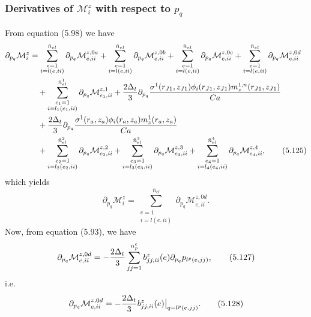 \documentclass{article}
\begin{document}
\subsubsection{Derivatives of $\mathcal{M}_i^z$ with respect to $p_q$} %
From equation (5.98) we have
\begin{align}
\partial_{p_q}\mathcal{M}_i^z &= \sum_{\substack{e=1\\ i=l(e,ii)}}^{\bar{n}_{el}} \partial_{p_q} \mathcal{M}_{e,ii}^{z,0a} + \sum_{\substack{e=1\\ i=l(e,ii)}}^{\bar{n}_{el}} \partial_{p_q} \mathcal{M}_{e,ii}^{z,0b} + \sum_{\substack{e=1\\ i=l(e,ii)}}^{\bar{n}_{el}} \partial_{p_q} \mathcal{M}_{e,ii}^{z,0c} + \sum_{\substack{e=1\\ i=l(e,ii)}}^{\bar{n}_{el}} \partial_{p_q} \mathcal{M}_{e,ii}^{z,0d} \nonumber\\
&\quad + \sum_{\substack{e_1=1\\ i=l_1(e_1,ii)}}^{\bar{n}_{el}^1} \partial_{p_q} \mathcal{M}_{e_1,ii}^{z,1} + \frac{2\Delta_t}{3} \partial_{p_q} \frac{\sigma^1(r_{J1},z_{J1}) \phi_i(r_{J1},z_{J1}) m_z^{1,n}(r_{J1},z_{J1})}{Ca} \nonumber\\
&\quad + \frac{2\Delta_t}{3} \partial_{p_q} \frac{\sigma^1(r_a,z_a) \phi_i(r_a,z_a) m_z^{1}(r_a,z_a)}{Ca} \nonumber\\
&\quad + \sum_{\substack{e_2=1\\ i=l_2(e_2,ii)}}^{\bar{n}_{el}^2} \partial_{p_q} \mathcal{M}_{e_2,ii}^{z,2} + \sum_{\substack{e_3=1\\ i=l_3(e_3,ii)}}^{\bar{n}_{el}^3} \partial_{p_q} \mathcal{M}_{e_3,ii}^{z,3} + \sum_{\substack{e_4=1\\ i=l_4(e_4,ii)}}^{\bar{n}_{el}^4} \partial_{p_q} \mathcal{M}_{e_4,ii}^{z,4}, \tag{5.125}
\end{align}
which yields
\begin{equation}
\partial_{p_q}\mathcal{M}_i^z = \sum_{\substack{e=1\\ i=l(e,ii)}}^{\bar{n}_{el}} \partial_{p_q} \mathcal{M}_{e,ii}^{z,0d}. \tag{5.126}
\end{equation}
Now, from equation (5.93), we have
\begin{equation}
\partial_{p_q}\mathcal{M}_{e,ii}^{z,0d} = -\frac{2\Delta_t}{3} \sum_{jj=1}^{n_p^e} b_{jj,ii}^z(e) \partial_{p_q} p_{l^p(e,jj)}, \tag{5.127}
\end{equation}
i.e.
\begin{equation}
\partial_{p_q}\mathcal{M}_{e,ii}^{z,0d} = -\frac{2\Delta_t}{3} b_{jj,ii}^z(e) \big|_{q=l^p(e,jj)}. \tag{5.128}
\end{equation}
\end{document}
